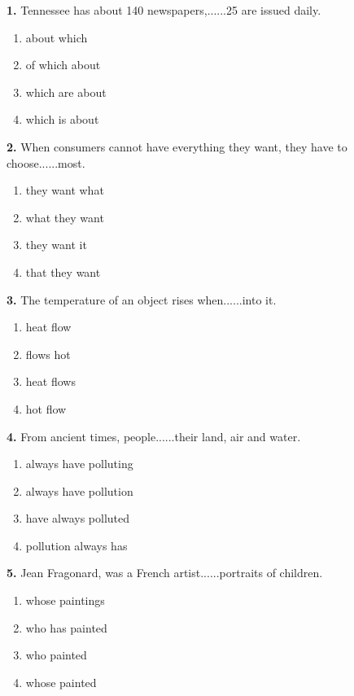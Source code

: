 \documentclass[12pt]{article}
\begin{document}
\noindent\textbf{1.} Tennessee has about 140 newspapers,......25 are issued daily.
\begin{enumerate}[label=(\Alph*),leftmargin=*,itemsep=0.2em]
\item about which
\item of which about
\item which are about
\item which is about
\end{enumerate}
\par
\vspace{0.25\baselineskip}
\noindent\textbf{2.} When consumers cannot have everything they want, they have to choose......most.
\begin{enumerate}[label=(\Alph*),leftmargin=*,itemsep=0.2em]
\item they want what
\item what they want
\item they want it
\item that they want
\end{enumerate}
\par
\vspace{0.25\baselineskip}
\noindent\textbf{3.} The temperature of an object rises when......into it.
\begin{enumerate}[label=(\Alph*),leftmargin=*,itemsep=0.2em]
\item heat flow
\item flows hot
\item heat flows
\item hot flow
\end{enumerate}
\par
\vspace{0.25\baselineskip}
\noindent\textbf{4.} From ancient times, people......their land, air and water.
\begin{enumerate}[label=(\Alph*),leftmargin=*,itemsep=0.2em]
\item always have polluting
\item always have pollution
\item have always polluted
\item pollution always has
\end{enumerate}
\par
\vspace{0.25\baselineskip}
\noindent\textbf{5.} Jean Fragonard, was a French artist......portraits of children.
\begin{enumerate}[label=(\Alph*),leftmargin=*,itemsep=0.2em]
\item whose paintings
\item who has painted
\item who painted
\item whose painted
\end{enumerate}
\end{document}
